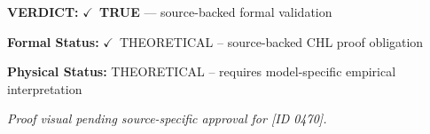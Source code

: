 \textbf{VERDICT:} \ensuremath{\checkmark}\ \textbf{TRUE} --- source-backed formal validation

\textbf{Formal Status:} \ensuremath{\checkmark}\ THEORETICAL -- source-backed CHL proof obligation

\textbf{Physical Status:} THEORETICAL -- requires model-specific empirical interpretation
\par\vspace{0.45em}
\par
\vfill
\begingroup\footnotesize\itshape
Proof visual pending source-specific approval for [ID 0470].
\par\endgroup
\vfill
\endgroup
\endgroup
